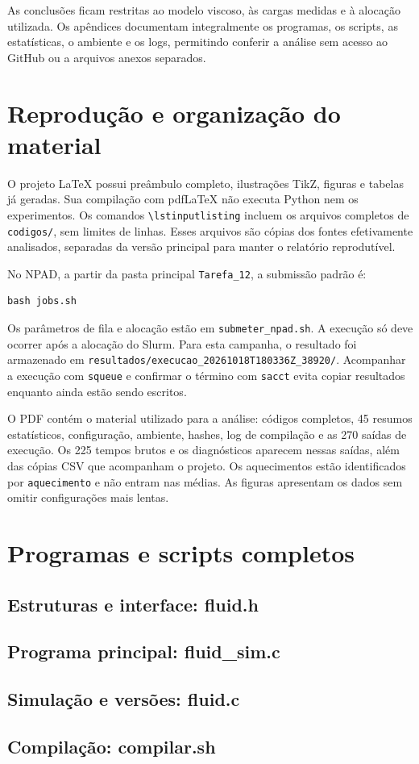 \documentclass[12pt,a4paper]{article}
\begin{document}
As conclusões ficam restritas ao modelo viscoso, às cargas medidas e à alocação utilizada. Os apêndices documentam integralmente os programas, os scripts, as estatísticas, o ambiente e os logs, permitindo conferir a análise sem acesso ao GitHub ou a arquivos anexos separados.

\clearpage
\appendix
\section{Reprodução e organização do material}
O projeto LaTeX possui preâmbulo completo, ilustrações TikZ, figuras e tabelas já geradas. Sua compilação com pdfLaTeX não executa Python nem os experimentos. Os comandos \texttt{\textbackslash lstinputlisting} incluem os arquivos completos de \texttt{codigos/}, sem limites de linhas. Esses arquivos são cópias dos fontes efetivamente analisados, separadas da versão principal para manter o relatório reprodutível.

No NPAD, a partir da pasta principal \texttt{Tarefa\_12}, a submissão padrão é:
\begin{lstlisting}[style=Terminal]
bash jobs.sh
\end{lstlisting}
Os parâmetros de fila e alocação estão em \texttt{submeter\_npad.sh}. A execução só deve ocorrer após a alocação do Slurm. Para esta campanha, o resultado foi armazenado em \texttt{resultados/execucao\_20261018T180336Z\_38920/}. Acompanhar a execução com \texttt{squeue} e confirmar o término com \texttt{sacct} evita copiar resultados enquanto ainda estão sendo escritos.

O PDF contém o material utilizado para a análise: códigos completos, 45 resumos estatísticos, configuração, ambiente, hashes, log de compilação e as 270 saídas de execução. Os 225 tempos brutos e os diagnósticos aparecem nessas saídas, além das cópias CSV que acompanham o projeto. Os aquecimentos estão identificados por \texttt{aquecimento} e não entram nas médias. As figuras apresentam os dados sem omitir configurações mais lentas.

\section{Programas e scripts completos}
\subsection{Estruturas e interface: fluid.h}

\clearpage\subsection{Programa principal: fluid\_sim.c}

\clearpage\subsection{Simulação e versões: fluid.c}

\clearpage\subsection{Compilação: compilar.sh}

\end{document}

